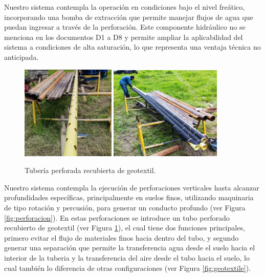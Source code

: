 \documentclass[12pt]{article}
\begin{document}
Nuestro sistema contempla la operación en condiciones bajo el nivel freático, incorporando una bomba de extracción que permite manejar flujos de agua que puedan ingresar a través de la perforación. Este componente hidráulico no se menciona en los documentos D1 a D8 y permite ampliar la aplicabilidad del sistema a condiciones de alta saturación, lo que representa una ventaja técnica no anticipada.
\begin{figure}[h]
\centering
\includegraphics[width=0.4\textwidth]{images/tubo_perforado.jpg}
\includegraphics[width=0.475\textwidth]{images/tubo_geotextil.jpg}
\caption{Tubería perforada recubierta de geotextil.}
\label{fig:tubo_geotextil}
\end{figure}


Nuestro sistema contempla la ejecución de perforaciones verticales hasta alcanzar profundidades específicas, principalmente en suelos finos, utilizando maquinaria de tipo rotación y percusión, para generar un conducto profundo (ver Figura \ref{fig:perforacion}). En estas perforaciones se introduce un tubo perforado recubierto de geotextil (ver Figura \ref{fig:tubo_geotextil}), el cual tiene dos funciones principales, primero evitar el flujo de materiales finos hacia dentro del tubo, y segundo generar una separación que permite la transferencia agua desde el suelo hacia el interior de la tuberia y la transferencia del aire desde el tubo hacia el suelo, lo cual también lo diferencia de otras configuraciones (ver Figura \ref{fig:geotextile}).
\end{document}
